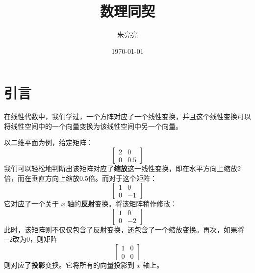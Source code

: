 \documentclass[cn]{simplepaper}
\begin{document}
\title{数理同契}
\author{朱亮亮}
\date{\today}
\maketitle

\section{引言}

在线性代数中，我们学过，一个方阵对应了一个线性变换，并且这个线性变换可以将线性空间中的一个向量变换为该线性空间中另一个向量。

以二维平面为例，给定矩阵：
\[
    \begin{bmatrix}
        2 & 0    \\
        0 & 0.5
    \end{bmatrix}
\]
我们可以轻松地判断出该矩阵对应了\textbf{缩放}这一线性变换，即在水平方向上缩放2倍，而在垂直方向上缩放0.5倍。而对于这个矩阵：
\[
    \begin{bmatrix}
        1 & 0   \\
        0 & -1
    \end{bmatrix}
\]
它对应了一个关于 \( x \) 轴的\textbf{反射}变换。将该矩阵稍作修改：
\[
    \begin{bmatrix}
        1 & 0   \\
        0 & -2
    \end{bmatrix}
\]
此时，该矩阵则不仅仅包含了反射变换，还包含了一个缩放变换。再次，如果将\( -2 \)改为\( 0 \)，则矩阵
\[
    \begin{bmatrix}
        1 & 0  \\
        0 & 0
    \end{bmatrix}
\]
则对应了\textbf{投影}变换。它将所有的向量投影到 \( x \) 轴上。
\end{document}
